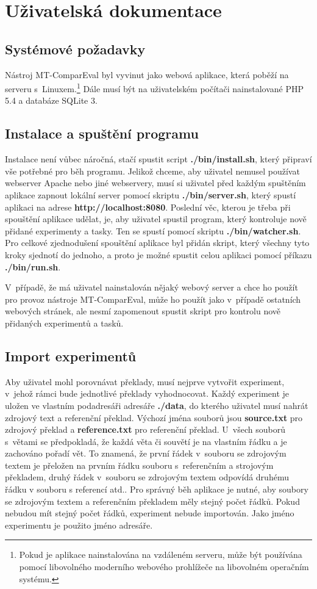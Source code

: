 \chapter{Uživatelská dokumentace}
\label{chap:users}

\section{Systémové požadavky}
Nástroj MT-ComparEval byl vyvinut jako webová aplikace,
  která poběží na serveru s~Linuxem.\footnote{
    Pokud je aplikace nainstalována na vzdáleném serveru, může být používána pomocí libovolného moderního webového prohlížeče na libovolném operačním systému.
  }
Dále musí být na uživatelském počítači nainstalované PHP 5.4 a databáze SQLite 3.

\section{Instalace a spuštění programu}
Instalace není vůbec náročná,
  stačí spustit script \textbf{./bin/install.sh},
  který připraví vše potřebné pro běh programu. 
Jelikož chceme,
  aby uživatel nemusel používat webserver Apache nebo jiné webservery,
  musí si uživatel před každým spuštěním aplikace zapnout lokální server pomocí skriptu \textbf{./bin/server.sh},
  který spustí aplikaci na adrese \textbf{http://localhost:8080}.
Poslední věc,
  kterou je třeba při spouštění aplikace udělat, je,
  aby uživatel spustil program,
  který kontroluje nově přidané experimenty a tasky.
Ten se spustí pomocí skriptu \textbf{./bin/watcher.sh}.
Pro celkové zjednodušení spouštění aplikace byl přidán skript,
  který všechny tyto kroky sjednotí do jednoho,
  a proto je možné spustit celou aplikaci pomocí příkazu \textbf{./bin/run.sh}.

V~případě, že má uživatel nainstalován nějaký webový server
  a chce ho použít pro provoz nástroje MT-ComparEval,
  může ho použít jako v~případě ostatních webových stránek,
  ale nesmí zapomenout spustit skript pro kontrolu nově přidaných experimentů a tasků.

\section{Import experimentů}
Aby uživatel mohl porovnávat překlady,
  musí nejprve vytvořit experiment,
  v~jehož rámci bude jednotlivé překlady vyhodnocovat.
Každý experiment je uložen ve vlastním podadresáři adresáře \textbf{./data},
  do kterého uživatel musí nahrát zdrojový text a referenční překlad.
Výchozí jména souborů jsou \textbf{source.txt} pro zdrojový překlad
  a \textbf{reference.txt} pro referenční překlad.
U~všech souborů s~větami se předpokladá,
  že každá věta či souvětí je na vlastním řádku
  a je zachováno pořadí vět.
To znamená, že první řádek v~souboru se zdrojovým textem je přeložen na prvním řádku souboru s~referenčním a strojovým překladem,
  druhý řádek v~souboru se zdrojovým textem odpovídá druhému řádku v souboru s referencí atd..
Pro správný běh aplikace je nutné, aby soubory se zdrojovým textem a referenčním překladem měly stejný počet řádků.
Pokud nebudou mít stejný počet řádků, experiment nebude importován.
Jako jméno experimentu je použito jméno adresáře.

